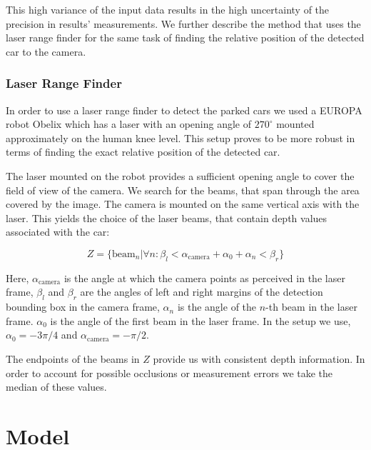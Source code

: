This high variance of the input data results in the high uncertainty of the
precision in results' measurements. We further describe the method that uses
the laser range finder for the same task of finding the relative position of
the detected car to the camera.

\subsubsection{Laser Range Finder}\label{ssub:laser_range_finder}

In order to use a laser range finder to detect the parked cars we used a
EUROPA robot Obelix which has a laser with an opening angle of $270^\circ$
mounted approximately on the human knee level. This setup proves to be more
robust in terms of finding the exact relative position of the detected car.

The laser mounted on the robot provides a sufficient opening angle to cover
the field of view of the camera. We search for the beams, that span through
the area covered by the image. The camera is mounted on the same vertical axis
with the laser. This yields the choice of the laser beams, that contain depth
values associated with the car:

\begin{equation}
Z = \{ \mathrm{beam}_n | \forall n : \beta_{l} < \alpha_{\mathrm{camera}} + \alpha_{0} + \alpha_{n} < \beta_{r} \}
\end{equation}

Here, $\alpha_\mathrm{camera}$ is the angle at which the camera points as perceived
in the laser frame, $\beta_{l}$ and $\beta_{r}$ are the angles of left and
right margins of the detection bounding box in the camera frame, $\alpha_{n}$
is the angle of the $n$-th beam in the laser frame. $\alpha_{0}$ is the angle
of the first beam in the laser frame. In the setup we use, $\alpha_{0} =
-3\pi/4$ and $\alpha_\mathrm{camera} = -\pi/2$.

The endpoints of the beams in $Z$ provide us with consistent depth
information. In order to account for possible occlusions or measurement errors
we take the median of these values.


\section{Model} %
\label{sec:model}

